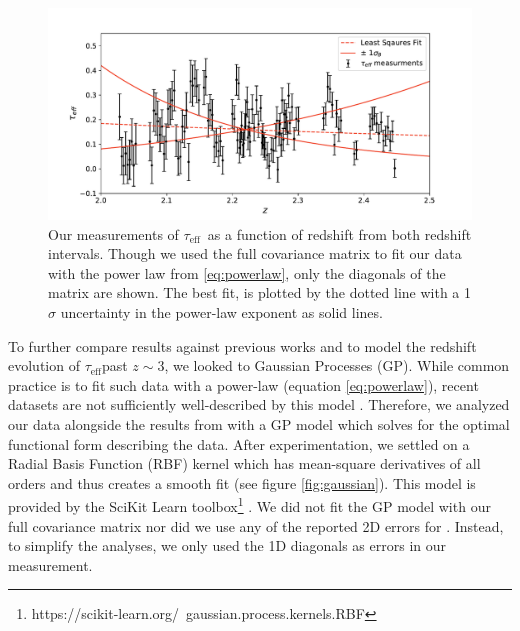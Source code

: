 \documentclass[twocolumn,tight,times]{aastex63}
\newcommand{\mteff}{\tau_\mathrm{eff}}
\newcommand{\teff}{$\mteff$}
\begin{document}
\begin{figure}[ht]
    \centering
    \includegraphics[scale=.5]{least_squares.pdf}
    \caption{Our measurements of \teff\ as a function of redshift from both redshift intervals. Though we used the full covariance matrix to fit our data with the power law from \ref{eq:powerlaw}, only the diagonals of the matrix are shown. The best fit, is plotted by the dotted line with a 1$\sigma$ uncertainty in the power-law exponent as solid lines.}
    \label{fig:powerlaw}
\end{figure}

To further compare results against previous works \citep{Schaye_2003, Kirkman_2005, Becker_2013} and to model the redshift evolution of \teff past $z \sim 3$, we looked to Gaussian Processes (GP). While common practice is to fit such data with a power-law (equation \ref{eq:powerlaw}), recent datasets are not sufficiently well-described by this model \citep{Becker_2013}. Therefore, we analyzed our data alongside the results from \cite{Schaye_2003, Kirkman_2005, Becker_2013} with a GP model which solves for the optimal functional form describing the data. After experimentation, we settled on a Radial Basis Function (RBF) kernel which has mean-square derivatives of all orders and thus creates a smooth fit (see figure \ref{fig:gaussian}). This model is provided by the SciKit Learn toolbox\footnote{https://scikit-learn.org/~gaussian.process.kernels.RBF} \citep{scikit-learn}. We did not fit the GP model with our full covariance matrix nor did we use any of the reported 2D errors for  \citep{Schaye_2003, Kirkman_2005, Becker_2013}. Instead, to simplify the analyses, we only used the 1D diagonals as errors in our measurement.
 
\end{document}
